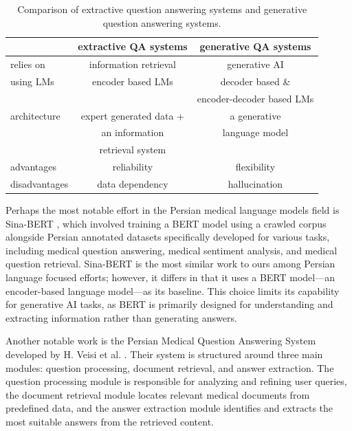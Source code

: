 \documentclass[conference]{IEEEtran}
\begin{document}
	\begin{table}[ht]
		\centering
		\caption{Comparison of extractive question answering systems and  generative question answering systems.} 
		\begin{tabular}{|l|c|c|}  
			\hline
			& extractive QA systems & generative QA systems \\ \hline
			relies on & information retrieval & generative AI \\ \hline
			using LMs & encoder based LMs & decoder based \&   \\ 
			 &  & encoder-decoder based LMs  \\ \hline
                        architecture & expert generated data +  & a generative \\ 
                         & an information &  language model \\ 
                         & retrieval system &  \\ \hline
			advantages& reliability  &  flexibility  \\ \hline
			disadvantages& data dependency  & hallucination	\\ \hline
		\end{tabular}
		\label{tab:ext_gen_comparison}
	\end{table}
	
	Perhaps the most notable effort in the Persian medical language models field is Sina-BERT \cite{b4}, which involved training a BERT model \cite{b12}
	 using a crawled corpus alongside Persian annotated datasets specifically developed for various tasks, including medical question answering, medical sentiment analysis, and medical question retrieval. Sina-BERT is the most similar work to ours among Persian language focused efforts; however, it differs in that it uses a BERT model—an encoder-based language model—as its baseline. This choice limits its capability for generative AI tasks, as BERT is primarily designed for understanding and extracting information rather than generating answers.
	
	Another notable work is the Persian Medical Question Answering System developed by H. Veisi et al.
	\cite{b13}.
	Their system is structured around three main modules: question processing, document retrieval, and answer extraction. The question processing module is responsible for analyzing and refining user queries, the document retrieval module locates relevant medical documents from predefined data, and the answer extraction module identifies and extracts the most suitable answers from the retrieved content.
	
\end{document}
